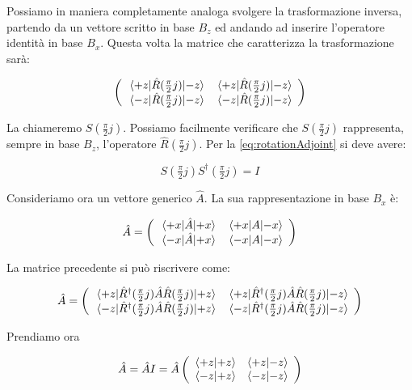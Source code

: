 Possiamo in maniera completamente analoga svolgere la trasformazione inversa, partendo da un vettore scritto in base $B_z$ ed andando ad inserire l'operatore identit\`a in base $B_x$. Questa volta la matrice che caratterizza la trasformazione sar\`a:

	\[
		\left ( \begin{array}{c c}
			\mel{+z}{\hat{R} ( \tfrac{\pi}{2} j)}{-z} & \mel{+z}{\hat{R} ( \tfrac{\pi}{2} j)}{-z} \\ 
			\mel{-z}{\hat{R} ( \tfrac{\pi}{2} j)}{-z} & \mel{-z}{\hat{R} ( \tfrac{\pi}{2} j)}{-z} \\ 
		\end{array} \right )
	\]

La chiameremo $S( \tfrac{\pi}{2} j )$. Possiamo facilmente verificare che $S ( \tfrac{\pi}{2} j )$ rappresenta, sempre in base $B_z$, l'operatore $\hat{R} ( \tfrac{\pi}{2} j)$. Per la \eqref{eq:rotationAdjoint} si deve avere:

	\begin{equation}
	  S ( \tfrac{\pi}{2} j ) S^\dagger ( \tfrac{\pi}{2} j ) = I
	\end{equation}

Consideriamo ora un vettore generico $\hat{A}$. La sua rappresentazione in base $B_x$ \`e:

	\[
		\hat{A} = 
			\left ( \begin{array}{c c}
				\mel{+x}{\hat{A}}{+x} & \mel{+x}{A}{-x} \\
				\mel{-x}{\hat{A}}{+x} & \mel{-x}{A}{-x}
			\end{array} \right )
	\]

La matrice precedente si pu\`o riscrivere come:

	\begin{equation}
		\hat{A} = 
			\left ( \begin{array}{c c}
				\mel{+z}{ \hat{R} ^\dagger( \tfrac{\pi}{2} j) \hat{A} \hat{R} ( \tfrac{\pi}{2} j) }{+z} & 
				\mel{+z}{ \hat{R} ^\dagger( \tfrac{\pi}{2} j) \hat{A} \hat{R} ( \tfrac{\pi}{2} j) }{-z} \\
				\mel{-z}{ \hat{R} ^\dagger( \tfrac{\pi}{2} j) \hat{A} \hat{R} ( \tfrac{\pi}{2} j) }{+z} & 
				\mel{-z}{ \hat{R} ^\dagger( \tfrac{\pi}{2} j) \hat{A} \hat{R} ( \tfrac{\pi}{2} j) }{-z}
			\end{array} \right )
	\end{equation}

Prendiamo ora

	\begin{equation}
		\hat{A} = \hat{A} I = \hat{A} 
			\left ( \begin{array}{c c}
				\braket{+z}{+z} & \braket{+z}{-z} \\
				\braket{-z}{+z} & \braket{-z}{-z}
			\end{array} \right )
	\end{equation}

